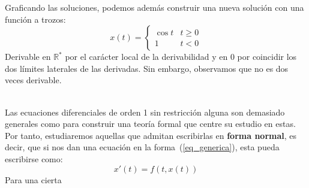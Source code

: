 \begin{ejemplo}
\begin{center}
    \end{center}
\fi

    Graficando las soluciones, podemos además construir una nueva solución con una función a trozos:
    \begin{equation*}
        x(t) = \left\{\begin{array}{ll}
                \cos t & t \geq 0 \\
                1 & t<0
        \end{array}\right.
    \end{equation*}
    Derivable en $\mathbb{R}^*$ por el carácter local de la derivabilidad y en 0 por coincidir los dos límites laterales de las derivadas. Sin embargo, observamos que no es dos veces derivable.
\end{ejemplo}~\\

Las ecuaciones diferenciales de orden 1 sin restricción alguna son demasiado generales como para construir una teoría formal que centre su estudio en estas. Por tanto, estudiaremos aquellas que admitan escribirlas en \textbf{forma normal}, es decir, que si nos dan una ecuación en la forma~(\ref{eq_generica}), esta pueda escribirse como:
\begin{equation}\label{eq_generica_normal}
    x'(t) = f(t,x(t))
\end{equation}
Para una cierta

